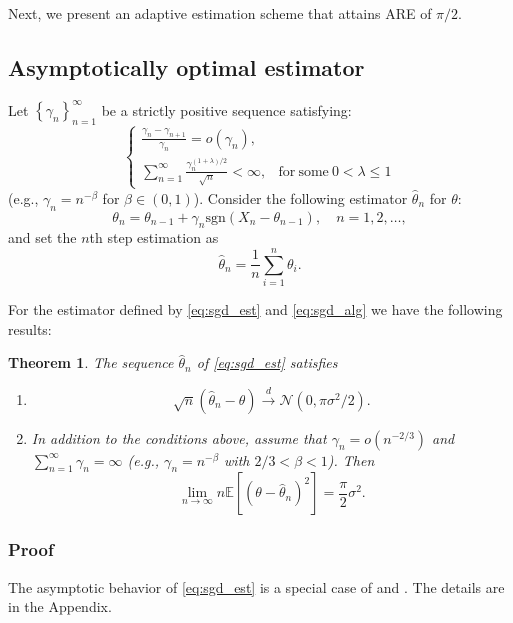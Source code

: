 \documentclass[letterpaper, conference]{IEEEtran}      %
\newtheorem{thm}{\bf{Theorem}}
\newcommand{\sgn}{\mathrm{sgn} }
\begin{document}
Next, we present an adaptive estimation scheme that attains ARE of $\pi/2$. 
\subsection{Asymptotically optimal estimator}
Let $\left\{\gamma_n \right\}_{n=1}^\infty$ be a strictly positive sequence satisfying:
\begin{equation} \label{eq:conditions}
\begin{cases}
\frac{\gamma_n - \gamma_{n+1}}{\gamma_n} = o(\gamma_n), &  \\
\sum_{n=1}^\infty \frac{\gamma_n^{(1+\lambda)/2}} {\sqrt{n}} < \infty, & 
\mathrm{for~some~}0< \lambda \leq 1
\end{cases}
\end{equation}
(e.g., $\gamma_n = n^{-\beta}$ for $\beta \in (0,1)$). Consider the following estimator $\widehat{\theta}_n$ for $\theta$:  
\begin{equation}
\label{eq:sgd_alg}
\theta_n = \theta_{n-1} +  \gamma_n \sgn (X_n - \theta_{n-1}), \quad n = 1,2,\ldots,
\end{equation}
and set the $n$th step estimation as
\begin{equation} \label{eq:sgd_est}
\widehat{\theta}_n =  \frac{1}{n} \sum_{i=1}^n  \theta_i. 
\end{equation}

For the estimator defined by \eqref{eq:sgd_est} and \eqref{eq:sgd_alg} we have the following results:
\begin{thm} \label{thm:sgd}
The sequence $\widehat{\theta}_n$ of \eqref{eq:sgd_est} satisfies
\begin{enumerate}
\item[(i)]
\[
\sqrt{n} \left( \widehat{\theta}_n - \theta \right) \overset{d}{\rightarrow} \mathcal N \left(0,  \pi \sigma^2 /2 \right).
\]
\item[(ii)] In addition to the conditions above, assume that $\gamma_n = o(n^{-2/3})$ and $\sum_{n=1}^\infty \gamma_n = \infty$ (e.g., $\gamma_n = n^{-\beta}$ with $2/3<\beta<1$). Then
\[
\lim_{n\rightarrow \infty} n\mathbb E \left[ \left(\theta-\widehat{\theta}_n \right)^2 \right] = \frac{\pi}{2} \sigma^2 . 
\]
\end{enumerate}

\end{thm}

\subsubsection*{Proof}
The asymptotic behavior of \eqref{eq:sgd_est} is a special case of \cite[Thm. 4]{polyak1992acceleration} and \cite[Thm. 2]{polyak1990new}. The details are in the Appendix.\\
\end{document}
